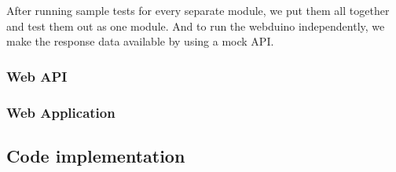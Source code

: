 After running sample tests for every separate module, we put them all together and test them out as one module. And to run the webduino independently, we make the response data available by using a mock API.

\subsubsection{Web API}


\subsubsection{Web Application}


\subsection{Code implementation}
